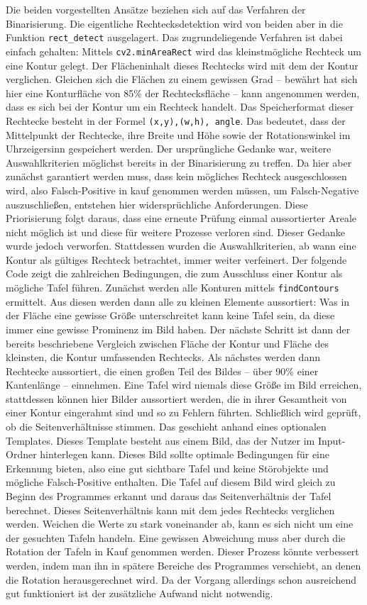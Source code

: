 Die beiden vorgestellten Ansätze beziehen sich auf das Verfahren der Binarisierung. Die eigentliche Rechtecksdetektion wird von beiden aber in die Funktion \verb|rect_detect| ausgelagert. Das zugrundeliegende Verfahren ist dabei einfach gehalten: Mittels \verb|cv2.minAreaRect| wird das kleinstmögliche Rechteck um eine Kontur gelegt. Der Flächeninhalt dieses Rechtecks wird mit dem der Kontur verglichen. Gleichen sich die Flächen zu einem gewissen Grad -- bewährt hat sich hier eine Konturfläche von 85\% der Rechtecksfläche -- kann angenommen werden, dass es sich bei der Kontur um ein Rechteck handelt. Das Speicherformat dieser Rechtecke besteht in der Formel \verb|(x,y),(w,h), angle|. Das bedeutet, dass der Mittelpunkt der Rechtecke, ihre Breite und Höhe sowie der Rotationswinkel im Uhrzeigersinn gespeichert werden. 
Der ursprüngliche Gedanke war, weitere Auswahlkriterien möglichst bereits in der Binarisierung zu treffen. Da hier aber zunächst garantiert werden muss, dass kein mögliches Rechteck ausgeschlossen wird, also Falsch-Positive in kauf genommen werden müssen, um Falsch-Negative auszuschließen, entstehen hier widersprüchliche Anforderungen. Diese Priorisierung folgt daraus, dass eine erneute Prüfung einmal aussortierter Areale nicht möglich ist und diese für weitere Prozesse verloren sind.
Dieser Gedanke wurde jedoch verworfen. Stattdessen wurden die Auswahlkriterien, ab wann eine Kontur als gültiges Rechteck betrachtet, immer weiter verfeinert. Der folgende Code zeigt die zahlreichen Bedingungen, die zum Ausschluss einer Kontur als mögliche Tafel führen.
Zunächst werden alle Konturen mittels \verb|findContours| ermittelt. Aus diesen werden dann alle zu kleinen Elemente aussortiert: Was in der Fläche eine gewisse Größe unterschreitet kann keine Tafel sein, da diese immer eine gewisse Prominenz im Bild haben. Der nächste Schritt ist dann der bereits beschriebene Vergleich zwischen Fläche der Kontur und Fläche des kleinsten, die Kontur umfassenden Rechtecks. Als nächstes werden dann Rechtecke aussortiert, die einen großen Teil des Bildes -- über 90\% einer Kantenlänge -- einnehmen. Eine Tafel wird niemals diese Größe im Bild erreichen, stattdessen können hier Bilder aussortiert werden, die in ihrer Gesamtheit von einer Kontur eingerahmt sind und so zu Fehlern führten. Schließlich wird geprüft, ob die Seitenverhältnisse stimmen. Das geschieht anhand eines optionalen Templates. Dieses Template besteht aus einem Bild, das der Nutzer im Input-Ordner hinterlegen kann. Dieses Bild sollte optimale Bedingungen für eine Erkennung bieten, also eine gut sichtbare Tafel und keine Störobjekte und mögliche Falsch-Positive enthalten. Die Tafel auf diesem Bild wird gleich zu Beginn des Programmes erkannt und daraus das Seitenverhältnis der Tafel berechnet. Dieses Seitenverhältnis kann mit dem jedes Rechtecks verglichen werden. Weichen die Werte zu stark voneinander ab, kann es sich nicht um eine der gesuchten Tafeln handeln. Eine gewissen Abweichung muss aber durch die Rotation der Tafeln in Kauf genommen werden. Dieser Prozess könnte verbessert werden, indem man ihn in spätere Bereiche des Programmes verschiebt, an denen die Rotation herausgerechnet wird. Da der Vorgang allerdings schon ausreichend gut funktioniert ist der zusätzliche Aufwand nicht notwendig.

